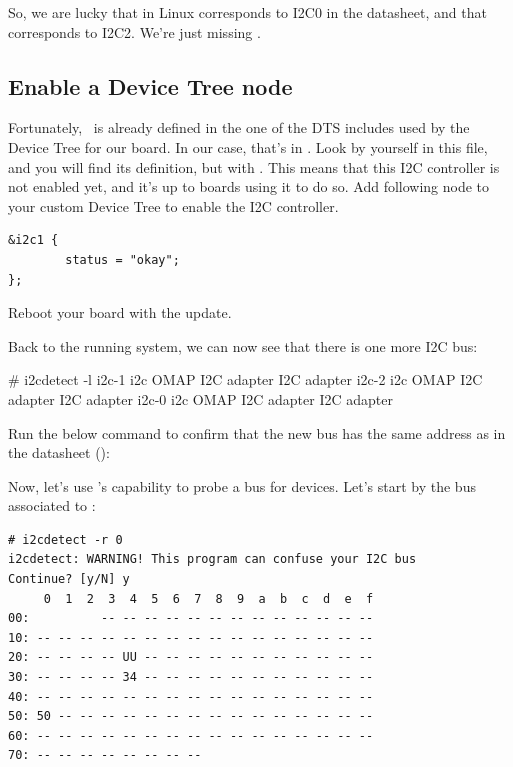 {So, we are lucky that  in Linux corresponds to I2C0 in the
datasheet, and that  corresponds to I2C2.
We're just missing .

\subsection{Enable a Device Tree node}

Fortunately, \busname\ is already defined in the one of the DTS includes
used by the Device Tree for our board. In our case, that's in
. Look by yourself in this
file, and you will find its definition, but with . This means that this I2C controller is not enabled yet,
and it's up to boards using it to do so. Add following node to your custom
Device Tree to enable the I2C controller.

\begin{verbatim}
&i2c1 {
        status = "okay";
};
\end{verbatim}

Reboot your board with the update.

Back to the running system, we can now see that there is one more
I2C bus:

\begin{bashinput}
# i2cdetect -l
i2c-1	i2c             OMAP I2C adapter                        I2C adapter
i2c-2	i2c             OMAP I2C adapter                        I2C adapter
i2c-0	i2c             OMAP I2C adapter                        I2C adapter
\end{bashinput}

Run the below command to confirm that the new bus has the same address
as in the datasheet ():


Now, let's use 's capability to probe a bus for devices.
Let's start by the bus associated to :

\begin{verbatim}
# i2cdetect -r 0
i2cdetect: WARNING! This program can confuse your I2C bus
Continue? [y/N] y
     0  1  2  3  4  5  6  7  8  9  a  b  c  d  e  f
00:          -- -- -- -- -- -- -- -- -- -- -- -- --
10: -- -- -- -- -- -- -- -- -- -- -- -- -- -- -- --
20: -- -- -- -- UU -- -- -- -- -- -- -- -- -- -- --
30: -- -- -- -- 34 -- -- -- -- -- -- -- -- -- -- --
40: -- -- -- -- -- -- -- -- -- -- -- -- -- -- -- --
50: 50 -- -- -- -- -- -- -- -- -- -- -- -- -- -- --
60: -- -- -- -- -- -- -- -- -- -- -- -- -- -- -- --
70: -- -- -- -- -- -- -- --
\end{verbatim}

}

